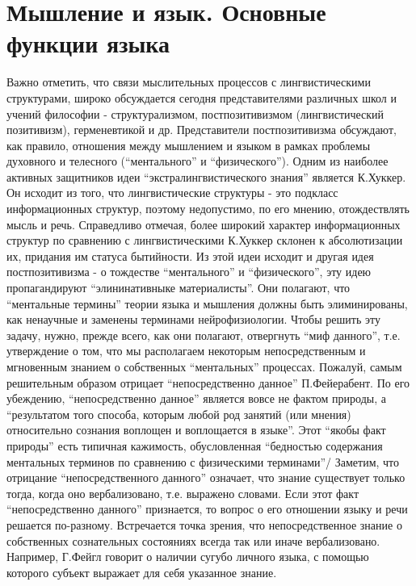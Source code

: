 \documentclass[12pt]{article}
\begin{document}
\newpage
\section{Мышление и язык. Основные функции языка}
Важно отметить, что связи мыслительных процессов с лингвистическими структурами, широко обсуждается
сегодня  представителями  различных  школ  и  учений  философии  -  структурализмом,   постпозитивизмом
(лингвистический позитивизм), герменевтикой и др. Представители постпозитивизма обсуждают, как правило,
отношения  между  мышлением  и  языком  в  рамках  проблемы  духовного  и  телесного  (“ментального”  и
“физического”).  Одним  из  наиболее  активных  защитников  идеи  “экстралингвистического  знания”  является
К.Хуккер.  Он  исходит  из  того,  что  лингвистические  структуры  -  это  подкласс  информационных  структур,
поэтому недопустимо, по его мнению, отождествлять мысль и речь. Справедливо отмечая, более широкий
характер информационных структур по сравнению с лингвистическими К.Хуккер склонен к абсолютизации их,
придания  им  статуса  бытийности.  Из  этой  идеи  исходит  и  другая  идея  постпозитивизма  -  о  тождестве
“ментального” и “физического”, эту идею пропагандируют  “элининативныке материалисты”. Они полагают,
что “ментальные термины” теории языка и мышления должны быть элиминированы, как ненаучные и заменены
терминами нейрофизиологии. Чтобы решить эту задачу, нужно, прежде всего, как они полагают, отвергнуть
“миф  данного”,  т.е.  утверждение  о  том,  что  мы  располагаем  некоторым  непосредственным  и  мгновенным
знанием  о  собственных  “ментальных”  процессах.  Пожалуй,  самым   решительным  образом  отрицает
“непосредственно  данное”  П.Фейерабент.  По  его  убеждению, “непосредственно  данное”  является  вовсе не
фактом природы, а “результатом того способа, которым любой род занятий (или мнения) относительно сознания
воплощен  и  воплощается  в  языке”.  Этот  “якобы  факт  природы”  есть  типичная  кажимость,  обусловленная
“бедностью содержания ментальных терминов по сравнению с физическими терминами”/
Заметим, что отрицание “непосредственного данного” означает, что знание существует только тогда, когда оно
вербализовано, т.е. выражено словами. Если этот факт “непосредственно данного” признается, то вопрос о его
отношении  языку  и  речи  решается  по-разному.  Встречается  точка  зрения,  что  непосредственное  знание  о
собственных сознательных состояниях всегда так или иначе вербализовано.  Например, Г.Фейгл говорит о
наличии  сугубо  личного  языка,  с  помощью  которого  субъект  выражает  для  себя  указанное  знание.
\end{document}
